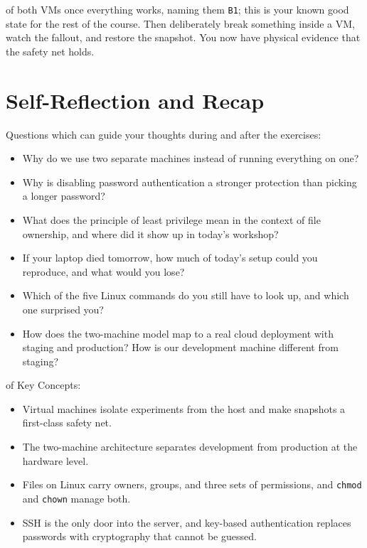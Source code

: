  of both VMs once everything works, naming them \texttt{B1}; this is your known good state for the rest of the course. Then deliberately break something inside a VM, watch the fallout, and restore the snapshot. You now have physical evidence that the safety net holds.







\newpage
\section{Self-Reflection and Recap}

 Questions which can guide your thoughts during and after the exercises:
\begin{itemize}
    \item Why do we use two separate machines instead of running everything on one?
    \item Why is disabling password authentication a stronger protection than picking a longer password?
    \item What does the principle of least privilege mean in the context of file ownership, and where did it show up in today's workshop?
    \item If your laptop died tomorrow, how much of today's setup could you reproduce, and what would you lose?
    \item Which of the five Linux commands do you still have to look up, and which one surprised you?
    \item How does the two-machine model map to a real cloud deployment with staging and production? 
    How is our development machine different from staging? 
\end{itemize}

 of Key Concepts:
\begin{itemize}
    \item Virtual machines isolate experiments from the host and make snapshots a first-class safety net.
    \item The two-machine architecture separates development from production at the hardware level.
    \item Files on Linux carry owners, groups, and three sets of permissions, and \texttt{chmod} and \texttt{chown} manage both.
    \item SSH is the only door into the server, and key-based authentication replaces passwords with cryptography that cannot be guessed.
\end{itemize}

